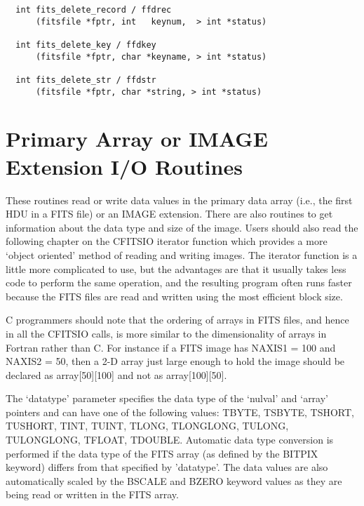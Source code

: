 \documentclass[11pt]{book}
\begin{document}
\begin{verbatim}
  int fits_delete_record / ffdrec
      (fitsfile *fptr, int   keynum,  > int *status)

  int fits_delete_key / ffdkey
      (fitsfile *fptr, char *keyname, > int *status)

  int fits_delete_str / ffdstr
      (fitsfile *fptr, char *string, > int *status)
\end{verbatim}

\section{Primary Array or IMAGE Extension I/O Routines}

These routines read or write data values in the primary data array (i.e.,
the first HDU in a FITS file) or an IMAGE extension.   There are also
routines to get information about the data type and size of the image.
Users should also read the following chapter on the CFITSIO iterator
function which provides a more `object oriented' method of reading and
writing images.  The iterator function is a little more complicated to
use, but the advantages are that it usually takes less code to perform
the same operation, and the resulting program often runs faster because
the FITS files are read and written using the most efficient block size.

C programmers should note that the ordering of arrays in FITS files, and
hence in all the CFITSIO calls, is more similar to the dimensionality
of arrays in Fortran rather than C.  For instance if a FITS image has
NAXIS1 = 100 and NAXIS2 = 50, then a 2-D array just large enough to hold
the image should be declared as array[50][100] and not as array[100][50].

The `datatype'  parameter specifies the data type of the `nulval'  and
`array' pointers and can have one of the following  values:  TBYTE,
TSBYTE, TSHORT, TUSHORT, TINT, TUINT, TLONG, TLONGLONG, TULONG, TULONGLONG, TFLOAT,
TDOUBLE.  Automatic data type conversion is performed if the data type
of the FITS array (as defined by the BITPIX keyword) differs from that
specified by 'datatype'.  The data values are also automatically scaled
by the BSCALE and BZERO keyword values as they are being read or written
in the FITS array.
\end{document}
